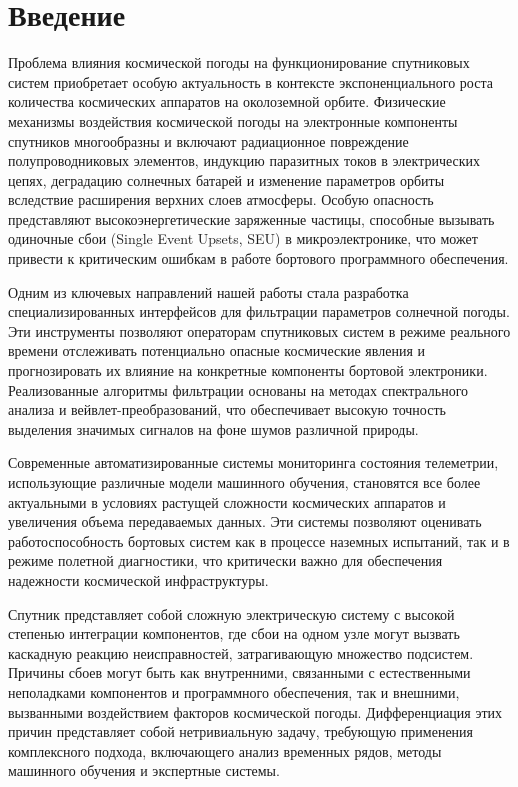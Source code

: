 \chapter*{Введение}

Проблема влияния космической погоды на функционирование спутниковых систем
приобретает особую актуальность в контексте экспоненциального роста количества
космических аппаратов на околоземной орбите.
Физические механизмы воздействия космической погоды на электронные компоненты
спутников многообразны и включают радиационное повреждение полупроводниковых
элементов, индукцию паразитных токов в электрических цепях, деградацию солнечных
батарей и изменение параметров орбиты вследствие расширения верхних слоев
атмосферы. Особую опасность представляют высокоэнергетические заряженные
частицы, способные вызывать одиночные сбои (Single Event Upsets, SEU) в
микроэлектронике, что может привести к критическим ошибкам в работе бортового
программного обеспечения.

Одним из ключевых направлений нашей работы стала разработка специализированных
интерфейсов для фильтрации параметров солнечной погоды. Эти инструменты
позволяют операторам спутниковых систем в режиме реального времени отслеживать
потенциально опасные космические явления и прогнозировать их влияние на
конкретные компоненты бортовой электроники. Реализованные алгоритмы фильтрации
основаны на методах спектрального анализа и вейвлет-преобразований, что
обеспечивает высокую точность выделения значимых сигналов на фоне шумов
различной природы.

Современные автоматизированные системы мониторинга состояния телеметрии,
использующие различные модели машинного обучения, становятся все более
актуальными в условиях растущей сложности космических аппаратов и увеличения
объема передаваемых данных. Эти системы позволяют оценивать работоспособность
бортовых систем как в процессе наземных испытаний, так и в режиме полетной
диагностики, что критически важно для обеспечения надежности космической
инфраструктуры.

Спутник представляет собой сложную электрическую систему с высокой степенью
интеграции компонентов, где сбои на одном узле могут вызвать каскадную реакцию
неисправностей, затрагивающую множество подсистем. Причины сбоев могут быть как
внутренними, связанными с естественными неполадками компонентов и программного
обеспечения, так и внешними, вызванными воздействием факторов космической
погоды. Дифференциация этих причин представляет собой нетривиальную задачу,
требующую применения комплексного подхода, включающего анализ временных рядов,
методы машинного обучения и экспертные системы.

